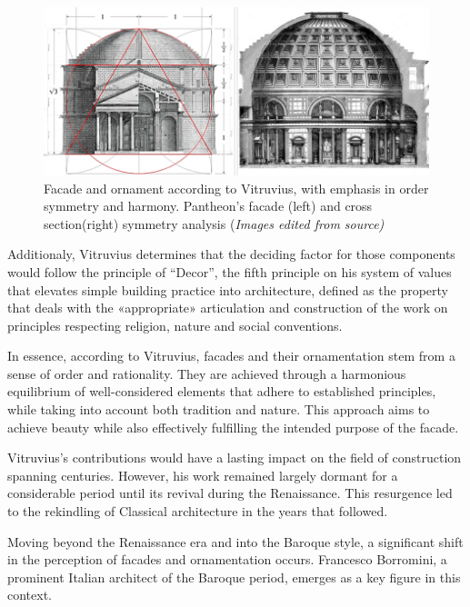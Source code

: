     \begin{figure}[htb]
        \centering
        \includegraphics[width= \linewidth]{Images/VitruvianArchitecture}
        \caption{Facade and ornament according to Vitruvius, with emphasis in order symmetry and harmony. Pantheon's facade (left) and cross section(right) symmetry analysis (\textit{Images edited from source)}}
        \label{fig:Vitruvianarchitecture}
    \end{figure}

Additionaly, Vitruvius determines that the deciding factor for those components would follow the principle of ``Decor'',  the  fifth  principle on his system of values that elevates simple  building  practice  into  architecture, defined as the property that  deals  with  the  «appropriate»  articulation and construction of the work on principles respecting religion, nature and social conventions\cite{Lefas2000}.

In essence, according to Vitruvius, facades and their ornamentation stem from a sense of order and rationality.
They are achieved through a harmonious equilibrium of well-considered elements that adhere to established principles, while taking into account both tradition and nature.
This approach aims to achieve beauty while also effectively fulfilling the intended purpose of the facade.

Vitruvius's contributions would have a lasting impact on the field of construction spanning centuries.
However, his work remained largely dormant for a considerable period until its revival during the Renaissance.
This resurgence led to the rekindling of Classical architecture in the years that followed\cite{Wikipedia2023}.

Moving beyond the Renaissance era and into the Baroque style, a significant shift in the perception of facades and ornamentation occurs.
Francesco Borromini, a prominent Italian architect of the Baroque period, emerges as a key figure in this context.

